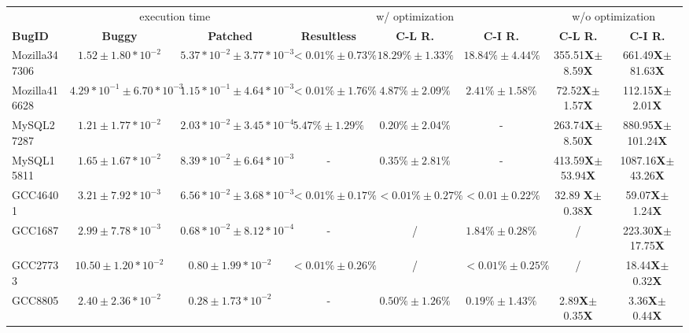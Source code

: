 \begin{table}[tb!]
  \centering
  \scriptsize
  \newcommand{\Yes}[1]{\checkmark{}$_#1$}
  \newcommand{\No}[0]{-}
  \begin{tabular}{lccccccc}
    \toprule
	    & \multicolumn{2}{c}{execution time} & \multicolumn{3}{c}{\Tool w/ optimization} & \multicolumn{2}{c}{w/o optimization} \\
     \cmidrule(lr){2-3}
     \cmidrule(lr){4-6}
     \cmidrule(lr){7-8}
     {\bf BugID}  & {\bf Buggy}  & {\bf Patched} & {\bf Resultless}  &  {\bf C-L R. } & {\bf C-I R. }  & {\bf C-L R.}  & {\bf C-I R. } \\
    \midrule
    Mozilla347306 &  $1.52\pm1.80*10^{-2}$ & $5.37*10^{-2}\pm3.77*10^{-3}$  &  $<0.01\%\pm0.73\%$  & $18.29\%\pm1.33\%$       &  $18.84\%\pm4.44\%$  & 355.51{\bf X}$\pm$8.59{\bf X} & 661.49{\bf X}$\pm$81.63{\bf X} \\ 
    Mozilla416628 &  $4.29*10^{-1}\pm6.70*10^{-3}$  & $1.15*10^{-1}\pm4.64*10^{-3}$  &  $<0.01\%\pm1.76\%$  & $4.87\%\pm2.09\%$ &  $2.41\%\pm1.58\%$ & 72.52{\bf X}$\pm$1.57{\bf X}  & 112.15{\bf X}$\pm$2.01{\bf X} \\
    \midrule
     MySQL27287   & $1.21\pm1.77*10^{-2}$& $2.03*10^{-2}\pm3.45*10^{-4}$ &  $5.47\%\pm1.29\%$   & $0.20\%\pm2.04\%$  &   - & 263.74{\bf X}$\pm$8.50{\bf X} & 880.95{\bf X}$\pm$101.24{\bf X} \\
     MySQL15811   & $1.65\pm1.67*10^{-2}$& $8.39*10^{-2}\pm6.64*10^{-3}$          &  -                   & $0.35\%\pm2.81\%$        &   -                  & 413.59{\bf X}$\pm$53.94{\bf X}& 1087.16{\bf X}$\pm$43.26{\bf X} \\
    \midrule
      GCC46401    & $3.21\pm7.92*10^{-3}$ & $6.56*10^{-2}\pm3.68*10^{-3}$          &  $<0.01\%\pm0.17\%$  & $<0.01\%\pm0.27\%$       &  $<0.01\pm0.22\%$    & 32.89 {\bf X}$\pm$0.38{\bf X} & 59.07{\bf X}$\pm$1.24{\bf X}\\ 
      GCC1687     & $2.99\pm7.78*10^{-3}$ & $0.68*10^{-2}\pm8.12*10^{-4}$          & -              & /                 &  $1.84\%\pm0.28\%$                &   /                           & 223.30{\bf X}$\pm$17.75{\bf X} \\
      GCC27733    &  $10.50\pm1.20*10^{-2}$ & $0.80\pm1.99*10^{-2}$           & $<0.01\%\pm0.26\%$   & /           &  $<0.01\%\pm0.25\%$               &   /                           & 18.44{\bf X}$\pm$0.32{\bf X}     \\
      GCC8805     & $2.40\pm2.36*10^{-2}$  & $0.28\pm1.73*10^{-2}$          & -              & $0.50\%\pm1.26\%$ &  $0.19\%\pm1.43\%$                & 2.89{\bf X}$\pm$0.35{\bf X}    & 3.36{\bf X}$\pm$0.44{\bf X}\\

\end{tabular}
\end{table}
